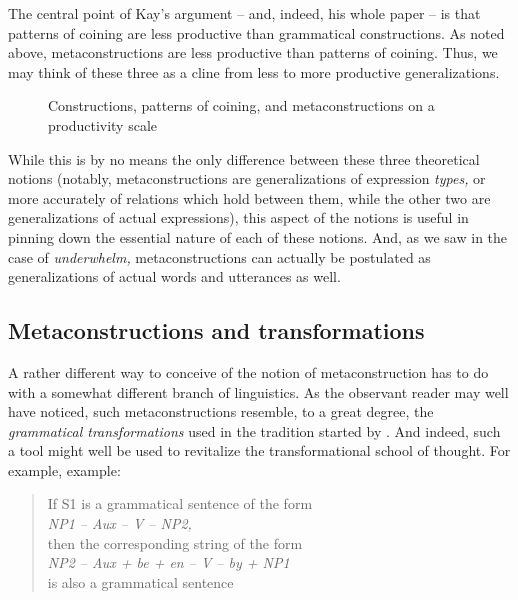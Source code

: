 \documentclass[output=paper, colorlinks,citecolor=brown]{langsci/langscibook}
\begin{document}
The central point of Kay’s argument -- and, indeed, his whole paper -- is that patterns of coining are less productive than grammatical constructions. As noted above, metaconstructions are less productive than patterns of coining. Thus, we may think of these three as a cline from less to more productive generalizations.

\begin{figure}
    \caption{Constructions, patterns of coining, and metaconstructions on a productivity scale}    
    \label{fig:leino_fig11}
\end{figure}

While this is by no means the only difference between these three theoretical notions (notably, metaconstructions are generalizations of expression \textit{types,} or more accurately of relations which hold between them, while the other two are generalizations of actual expressions), this aspect of the notions is useful in pinning down the essential nature of each of these notions. And, as we saw in the case of \textit{underwhelm,} metaconstructions can actually be postulated as generalizations of actual words and utterances as well.

\subsection{Metaconstructions and transformations}\label{sec:leino_3.2}

A rather different way to conceive of the notion of metaconstruction has to do with a somewhat different branch of linguistics. As the observant reader may well have noticed, such metaconstructions resemble, to a great degree, the \textit{grammatical transformations} used in the tradition started by \citet{Chomsky1957}. And indeed, such a tool might well be used to revitalize the transformational school of thought. For example,  example:

\begin{quote}
If S1 is a grammatical sentence of the form\\
 \textit{NP1 – Aux – V – NP2,}\\
then the corresponding string of the form\\
 \textit{NP2 – Aux + be + en – V – by + NP1}\\
is also a grammatical sentence
\end{quote}
\end{document}

